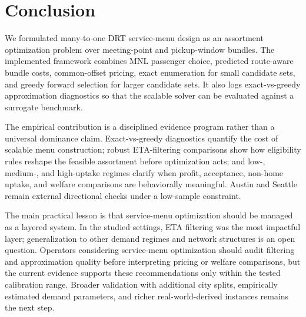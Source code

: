 \section{Conclusion}

We formulated many-to-one DRT service-menu design as an assortment optimization problem over meeting-point and pickup-window bundles. The implemented framework combines MNL passenger choice, predicted route-aware bundle costs, common-offset pricing, exact enumeration for small candidate sets, and greedy forward selection for larger candidate sets. It also logs exact-vs-greedy approximation diagnostics so that the scalable solver can be evaluated against a surrogate benchmark.

The empirical contribution is a disciplined evidence program rather than a universal dominance claim. Exact-vs-greedy diagnostics quantify the cost of scalable menu construction; robust ETA-filtering comparisons show how eligibility rules reshape the feasible assortment before optimization acts; and low-, medium-, and high-uptake regimes clarify when profit, acceptance, non-home uptake, and welfare comparisons are behaviorally meaningful. Austin and Seattle remain external directional checks under a low-sample constraint.

The main practical lesson is that service-menu optimization should be managed as a layered system. In the studied settings, ETA filtering was the most impactful layer; generalization to other demand regimes and network structures is an open question. Operators considering service-menu optimization should audit filtering and approximation quality before interpreting pricing or welfare comparisons, but the current evidence supports these recommendations only within the tested calibration range. Broader validation with additional city splits, empirically estimated demand parameters, and richer real-world-derived instances remains the next step.

